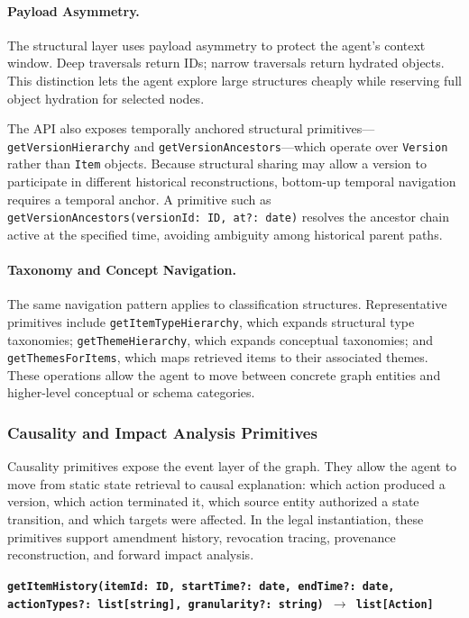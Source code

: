 \documentclass[11pt]{article}
\begin{document}
\paragraph{Payload Asymmetry.}
The structural layer uses payload asymmetry to protect the agent's context window. Deep traversals return IDs; narrow traversals return hydrated objects. This distinction lets the agent explore large structures cheaply while reserving full object hydration for selected nodes.

The API also exposes temporally anchored structural primitives---\texttt{getVersionHierarchy} and \texttt{getVersionAncestors}---which operate over \texttt{Version} rather than \texttt{Item} objects. Because structural sharing may allow a version to participate in different historical reconstructions, bottom-up temporal navigation requires a temporal anchor. A primitive such as \texttt{getVersionAncestors(versionId: ID, at?: date)} resolves the ancestor chain active at the specified time, avoiding ambiguity among historical parent paths.

\paragraph{Taxonomy and Concept Navigation.}
The same navigation pattern applies to classification structures. Representative primitives include \texttt{getItemTypeHierarchy}, which expands structural type taxonomies; \texttt{getThemeHierarchy}, which expands conceptual taxonomies; and \texttt{getThemesForItems}, which maps retrieved items to their associated themes. These operations allow the agent to move between concrete graph entities and higher-level conceptual or schema categories.

\subsubsection{Causality and Impact Analysis Primitives}
\label{subsubsec:causality_primitives}

Causality primitives expose the event layer of the graph. They allow the agent to move from static state retrieval to causal explanation: which action produced a version, which action terminated it, which source entity authorized a state transition, and which targets were affected. In the legal instantiation, these primitives support amendment history, revocation tracing, provenance reconstruction, and forward impact analysis.

\vspace{0.3cm}
\noindent\textbf{\texttt{getItemHistory(itemId: ID, startTime?: date, endTime?: date,}} \newline
\textbf{\texttt{actionTypes?: list[string], granularity?: string) $\rightarrow$ list[Action]}}
\end{document}
